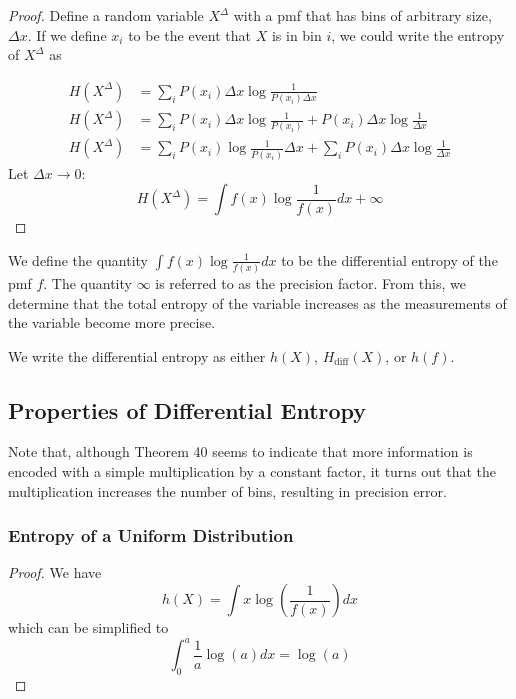 \documentclass[11pt]{article}
\theoremstyle{definition}
\begin{document}
\begin{proof}

Define a random variable $X^{\Delta}$ with a pmf that has bins of arbitrary size, $\Delta x$. If we define $x_i$ to be the event that $X$ is in bin $i$, we could write the entropy of $X^{\Delta}$ as 

\begin{align*}
H(X^{\Delta}) &= \sum_i P(x_i) \Delta x \log{\frac{1}{P(x_i) \Delta x}}  \\
H(X^{\Delta}) &= \sum_i P(x_i) \Delta x \log{\frac{1}{P(x_i)} } +  P(x_i) \Delta x \log{\frac{1}{\Delta x} } \\
H(X^{\Delta}) &= \sum_i P(x_i) \log{\frac{1}{P(x_i)} } \Delta x +  \sum_i P(x_i) \Delta x \log{\frac{1}{\Delta x} }
\end{align*}
Let $\Delta x \to 0$:
	$$H(X^{\Delta}) = \boxed{ \int f(x) \log{\frac{1}{f(x)}} dx} + \infty$$
	
\end{proof}
\noindent We define the quantity $\int f(x) \log{\frac{1}{f(x)}} dx$ to be the differential entropy of the pmf $f$. The quantity $\infty$ is referred to as the precision factor. From this, we determine that the total entropy of the variable increases as the measurements of the variable become more precise. 

\notation We write the differential entropy as either $h(X)$, $H_{\mathrm{diff}}(X)$, or $h(f)$. 
\subsection{Properties of Differential Entropy}

\remark Note that, although Theorem 40 seems to indicate that more information is encoded with a simple multiplication by a constant factor, it turns out that the multiplication increases the number of bins, resulting in precision error. 

\subsubsection{Entropy of a Uniform Distribution}

\begin{proof}
We have $$h(X) = \int x \log \left(\frac{1}{f(x)} \right) dx$$which can be simplified to $$\int_0^a \frac{1}{a} \log(a) dx = \log(a)$$
\end{proof}
\end{document}
